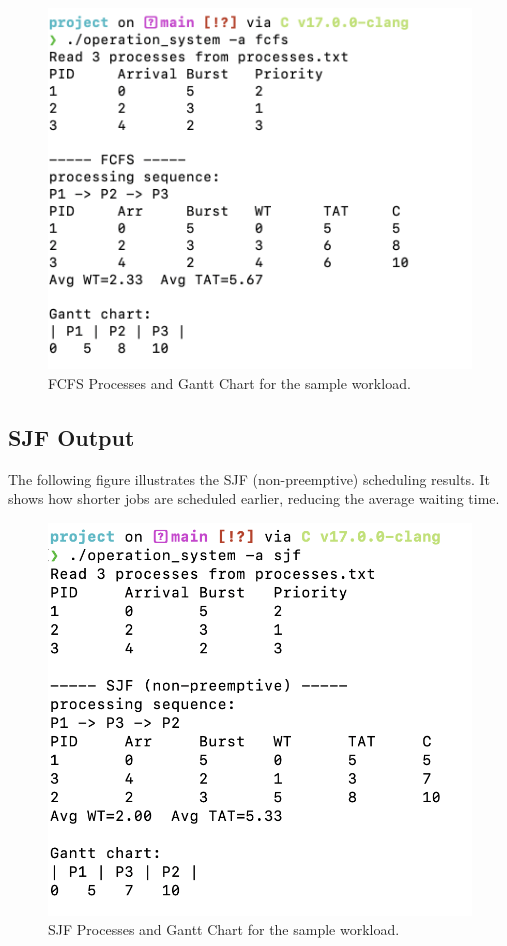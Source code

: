 \documentclass[12pt,a4paper]{article}
\begin{document}
\begin{figure}[H]
    \centering
    \includegraphics[width=\linewidth]{a_fcfs} 
    \caption{FCFS Processes and Gantt Chart for the sample workload.}
    \label{fig:fcfs}
\end{figure}
\FloatBarrier

\subsection{SJF Output}
The following figure illustrates the SJF (non-preemptive) scheduling results.
It shows how shorter jobs are scheduled earlier, reducing the average waiting time.

\begin{figure}[H]
    \centering
    \includegraphics[width=\linewidth]{a_sjf}
    \caption{SJF Processes and Gantt Chart for the sample workload.}
    \label{fig:sjf}
\end{figure}
\FloatBarrier
\end{document}
